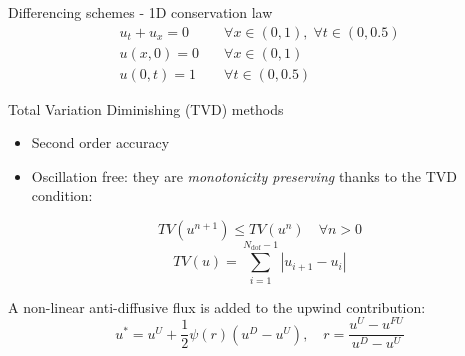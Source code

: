 \documentclass{beamer}
\begin{document}
\begin{frame}{Differencing schemes - 1D conservation law}
\vspace{-0.5cm}
	\begin{align*}
		u_t + u_x = 0 \quad &\forall x \in (0, 1), \; \forall t \in (0, 0.5)\\
		u(x, 0) = 0 \quad &\forall x \in (0, 1)\\
		u(0, t) = 1 \quad &\forall t \in (0, 0.5)
	\end{align*}
	\vspace{-1cm}
	\begin{figure}
		\centering
		
	\end{figure}
\end{frame}
\begin{frame}{Total Variation Diminishing (TVD) methods}
\begin{itemize}
	\item Second order accuracy
	\item Oscillation free: they are \emph{monotonicity preserving} thanks to 
	the TVD condition:
\end{itemize}
\vspace{0.3cm}
\begin{equation*}
	TV(u^{n+1}) \leq TV(u^n) \quad \forall n>0
\end{equation*}
\begin{equation*}
	TV(u) = 
	\sum_{i=1}^{N_\text{dof}-1} |u_{i+1} - u_i|
\end{equation*}

\vspace{0.3cm}
A non-linear anti-diffusive flux is added to the upwind contribution:
\begin{equation*}
u^* = u^U + \frac{1}{2} \psi(r)(u^D - u^U), \quad r = \frac{u^U - u^{FU}}{u^D 
- u^U}
\end{equation*}
\end{frame}
\end{document}
